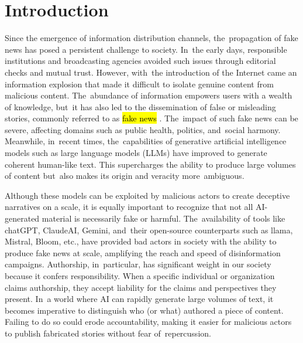 \documentclass[electronics,article,accept,pdftex,moreauthors,electronics]{Definitions/mdpi}
\begin{document}
\section{Introduction}\label{S1}

Since the emergence of information distribution channels, the~propagation of fake news has posed a persistent challenge to society. In~the early days, responsible institutions and broadcasting agencies avoided such issues through editorial checks and mutual trust. However, with~the introduction of the Internet came an information explosion that made it difficult to isolate genuine content from malicious content. The~abundance of information empowers users with a wealth of knowledge, but~it has also led to the dissemination of false or misleading stories, commonly referred to as \hl{fake news}%
. The~impact of such fake news can be severe, affecting domains such as public health, politics, and~social harmony. Meanwhile, in~recent times, the~capabilities of generative artificial intelligence models such as large language models (LLMs) have improved to generate coherent human-like text. This supercharges the ability to produce large volumes of content but~also makes its origin and veracity more~ambiguous. 

Although these models can be exploited by malicious actors to create deceptive narratives on a scale, it is equally important to recognize that not all AI-generated material is necessarily fake or harmful. The~availability of tools like chatGPT, ClaudeAI, Gemini, and~their open-source counterparts such as llama, Mistral, Bloom, etc., have provided bad actors in society with the ability to produce fake news at scale, amplifying the reach and speed of disinformation campaigns. Authorship, in~particular, has significant weight in our society because it confers responsibility. When a specific individual or organization claims authorship, they accept liability for the claims and perspectives they present. In~a world where AI can rapidly generate large volumes of text, it becomes imperative to distinguish who (or what) authored a piece of content. Failing to do so could erode accountability, making it easier for malicious actors to publish fabricated stories without fear of~repercussion.
\end{document}
